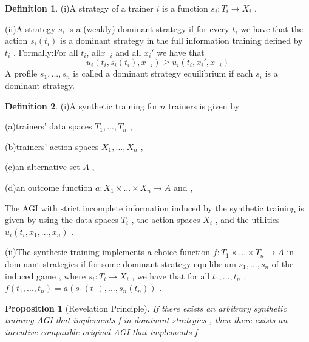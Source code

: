 \documentclass[10pt,reqno]{amsart}
\newtheorem{pro}{Proposition}[section]
\theoremstyle{definition}
\newtheorem{defn}{Definition}[section]
\theoremstyle{remark}
\numberwithin{equation}{section}
\begin{document}
\begin{defn}
(i)A strategy of a trainer $i$ is a function $s_i:T_i\rightarrow X_i$ .

(ii)A strategy $s_i$ is a (weakly) dominant strategy if for every $t_i$ we have that the action $s_i(t_i)$ is a dominant strategy in the full information training defined by $t_i$ . Formally:For all $t_i$, all$x_{-i}$ and all $x_i'$ we have that
\begin{equation}
 u_i(t_i,  s_i(t_i),x_{-i})\ge u_i(t_i, x_i',x_{-i})
\end{equation}
 A profile $s_1,...,s_n$ is called a dominant strategy equilibrium if each $s_i$ is a dominant strategy.
\end{defn}

\begin{defn}
(i)A synthetic training for $n$ trainers is given by

(a)trainers' data spaces $T_1,...,T_n$ ,

(b)trainers' action spaces $X_1,...,X_n$ ,

(c)an alternative set $A$ ,

(d)an outcome function $a:X_1\times...\times X_n\rightarrow A$ and ,


The AGI with strict incomplete information induced by the synthetic training is given by using the data spaces $T_i$ , the action spaces $X_i$ , and the utilities $u_i(t_i,x_1,...,x_n)$ .

(ii)The synthetic training implements a choice function $f:T_1\times...\times T_n\rightarrow A$ in dominant strategies if for some dominant strategy equilibrium $s_1,...,s_n$ of the induced game , where $s_i:T_i\rightarrow X_i$ , we have that for all $t_1,...,t_n$ , $f(t_1,...,t_n)=a(s_1(t_1),...,s_n(t_n))$ .

\end{defn}

\begin{pro}[Revelation Principle]
If there exists an arbitrary synthetic training AGI that implements f in dominant strategies , then there exists an incentive compatible original AGI that implements f. 
\end{pro}
\end{document}
